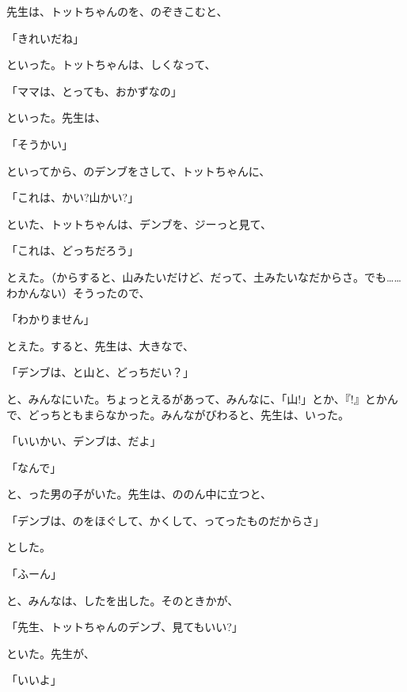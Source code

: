 先生は、トットちゃんのを、のぞきこむと、

「きれいだね」

といった。トットちゃんは、しくなって、

「ママは、とっても、おかずなの」

といった。先生は、

「そうかい」

といってから、のデンブをさして、トットちゃんに、

「これは、かい?山かい?」

といた、トットちゃんは、デンブを、ジーっと見て、

「これは、どっちだろう」

とえた。（からすると、山みたいだけど、だって、土みたいなだからさ。でも……わかんない）そうったので、

「わかりません」

とえた。すると、先生は、大きなで、

「デンブは、と山と、どっちだい？」

と、みんなにいた。ちょっとえるがあって、みんなに、「山!」とか、『!』とかんで、どっちともまらなかった。みんながびわると、先生は、いった。

「いいかい、デンブは、だよ」

「なんで」

と、った男の子がいた。先生は、ののん中に立つと、

「デンブは、のをほぐして、かくして、ってったものだからさ」

とした。

「ふーん」

と、みんなは、したを出した。そのときかが、

「先生、トットちゃんのデンブ、見てもいい?」

といた。先生が、

「いいよ」

